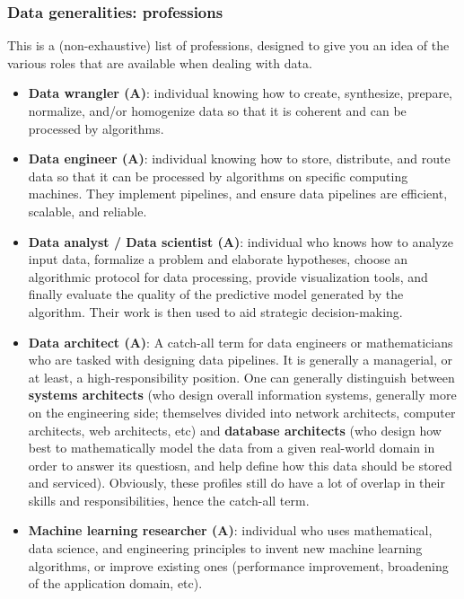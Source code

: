 \documentclass{article}
\begin{document}
\subsubsection*{Data generalities: professions}

This is a (non-exhaustive) list of professions, designed to give you an idea of the various roles that are available when dealing with data.

\begin{itemize}

	\item \textbf{Data wrangler (A)}: individual knowing how to create, synthesize, prepare, normalize, and/or homogenize data so that it is coherent and can be processed by algorithms.

	\item \textbf{Data engineer (A)}: individual knowing how to store, distribute, and route data so that it can be processed by algorithms on specific computing machines. They implement pipelines, and ensure data pipelines are efficient, scalable, and reliable.

	\item \textbf{Data analyst / Data scientist (A)}: individual who knows how to analyze input data, formalize a problem and elaborate hypotheses, choose an algorithmic protocol for data processing, provide visualization tools, and finally evaluate the quality of the predictive model generated by the algorithm. Their work is then used to aid strategic decision-making.

	\item \textbf{Data architect (A)}: A catch-all term for data engineers or mathematicians who are tasked with designing data pipelines. It is generally a managerial, or at least, a high-responsibility position. One can generally distinguish between \textbf{systems architects} (who design overall information systems, generally more on the engineering side; themselves divided into network architects, computer architects, web architects, etc) and \textbf{database architects} (who design how best to mathematically model the data from a given real-world domain in order to answer its questiosn, and help define how this data should be stored and serviced). Obviously, these profiles still do have a lot of overlap in their skills and responsibilities, hence the catch-all term.

	\item \textbf{Machine learning researcher (A)}: individual who uses mathematical, data science, and engineering principles to invent new machine learning algorithms, or improve existing ones (performance improvement, broadening of the application domain, etc).


\end{itemize}
\end{document}
